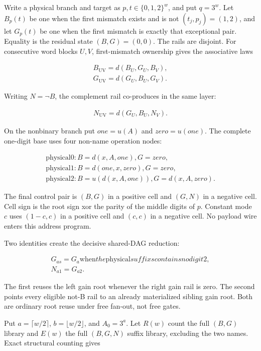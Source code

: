 \documentclass[
  11pt,
]{article}
\theoremstyle{definition}
\theoremstyle{remark}
\begin{document}
Write a physical branch and target as \(p,t \in \{0,1,2\}^w\), and put
\(q=3^w\). Let \(B_p(t)\) be one when the first mismatch exists and is
not \((t_j,p_j)=(1,2)\), and let \(G_p(t)\) be one when the first
mismatch is exactly that exceptional pair. Equality is the residual
state \((B,G)=(0,0)\). The rails are disjoint. For consecutive word
blocks \(U,V\), first-mismatch ownership gives the associative laws

\[
\begin{aligned}
B_{\mathrm{UV}}=d(B_U,G_U,B_V), \\
G_{\mathrm{UV}}=d(G_U,B_U,G_V).
\end{aligned}
\]

Writing \(N=\neg B\), the complement rail co-produces in the same layer:

\[
\begin{aligned}
N_{\mathrm{UV}}=d(G_U,B_U,N_V).
\end{aligned}
\]

On the nonbinary branch put \(one=u(A)\) and \(zero=u(one)\). The
complete one-digit base uses four non-name operation nodes:

\[
\begin{aligned}
\text{physical} 0: B=d(x,A,one),       G=zero, \\
\text{physical} 1: B=d(one,x,zero),    G=zero, \\
\text{physical} 2: B=u(d(x,A,one)),    G=d(x,A,zero).
\end{aligned}
\]

The final control pair is \((B,G)\) in a positive cell and \((G,N)\) in
a negative cell. Cell sign is the root sign xor the parity of the middle
digits of \(p\). Constant mode \(c\) uses \((1-c,c)\) in a positive cell
and \((c,c)\) in a negative cell. No payload wire enters this address
program.

Two identities create the decisive shared-DAG reduction:

\[
\begin{aligned}
G_{a s}=G_a       \text{when} the \text{physical} suffix s contains no digit 2, \\
N_{a1}=G_{a2}.
\end{aligned}
\]

The first reuses the left gain root whenever the right gain rail is
zero. The second points every eligible not-B rail to an already
materialized sibling gain root. Both are ordinary root reuse under free
fan-out, not free gates.

Put \(a=\lceil w/2 \rceil\), \(b=\lfloor w/2 \rfloor\), and \(A_0=3^a\).
Let \(R(w)\) count the full \((B,G)\) library and \(E(w)\) the full
\((B,G,N)\) suffix library, excluding the two names. Exact structural
counting gives
\end{document}

